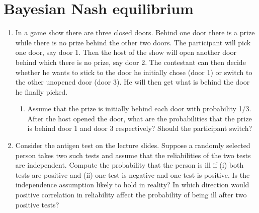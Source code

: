 \documentclass[a4paper,12pt]{article}
\begin{document}
\section{Bayesian Nash equilibrium}
\label{sec:bayes-nash-equil}

\begin{enumerate}[resume]
\item In a game show there are three closed doors. Behind one door there is a prize while there is no prize behind the other two doors. The participant will pick one door, say door 1. Then the host of the show will open another door behind which there is no prize, say door 2. The contestant can then decide whether he wants to stick to the door he initially chose (door 1) or switch to the other unopened door (door 3). He will then get what is behind the door he finally picked.
  \begin{enumerate}
  \item Assume that the prize is initially behind each door with probability 1/3. After the host opened the door, what are the probabilities that the prize is behind door 1 and door 3 respectively? Should the participant switch?
  \end{enumerate}
\item Consider the antigen test on the lecture slides. Suppose a randomly selected person takes two such tests and assume that the reliabilities of the two tests are independent. Compute the probability that the person is ill if (i) both tests are positive and (ii) one test is negative and one test is positive. Is the independence assumption likely to hold in reality? In which direction would positive correlation in reliability affect the probability of being ill after two positive tests?

\end{enumerate}
\end{document}

